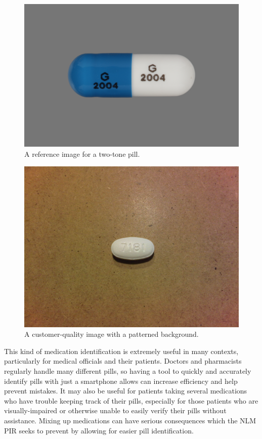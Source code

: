 \documentclass{article}
\begin{document}
\begin{figure}
    \includegraphics[width=\linewidth]{images/ref_two_color.jpg}
    \caption{A reference image for a two-tone pill.}
    \label{fig:ref-two-color}
\end{figure}

\begin{figure}
    \includegraphics[width=\linewidth]{images/cust_weird_bg.jpg}
    \caption{A customer-quality image with a patterned background.}
    \label{fig:cust-weird-bg}
\end{figure}

This kind of medication identification is extremely useful in many contexts, particularly for medical officials and their patients. Doctors and pharmacists regularly handle many different pills, so having a tool to quickly and accurately identify pills with just a smartphone allows can increase efficiency and help prevent mistakes. It may also be useful for patients taking several medications who have trouble keeping track of their pills, especially for those patients who are visually-impaired or otherwise unable to easily verify their pills without assistance. Mixing up medications can have serious consequences which the NLM PIR seeks to prevent by allowing for easier pill identification.
\end{document}
